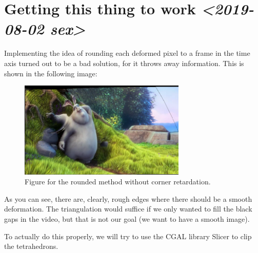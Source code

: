 \documentclass[11pt]{article}
\begin{document}
\section*{Getting this thing to work \textit{<2019-08-02 sex>}}
\label{sec:org7fe0a14}

Implementing the idea of rounding each deformed pixel to a frame in the time axis turned out to be a bad solution, for it throws away information. This is shown in the following image:

\begin{figure}[htbp]
\centering
\includegraphics[width=300px]{res/roundResult.png}
\caption{Figure for the rounded method without corner retardation.}
\end{figure}

As you can see, there are, clearly, rough edges where there should be a smooth deformation. The triangulation would suffice if we only wanted to fill the black gaps in the video, but that is not our goal (we want to have a smooth image).

To actually do this properly, we will try to use the CGAL library Slicer to clip the tetrahedrons.
\end{document}
